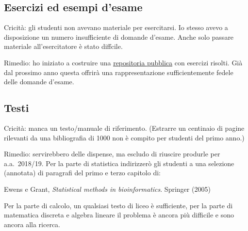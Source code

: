 \documentclass[10pt]{article}
\begin{document}
\subsection{Esercizi ed esempi d'esame}

Cricità: gli studenti non avevano materiale per esercitarsi. Io stesso avevo a disposizione un numero insufficiente di domande d'esame. Anche solo passare materiale all'esercitatore è stato diffcile.

Rimedio: ho iniziato a costruire una \href{https://github.com/domenicozambella/teaching/tree/master/Statistica}{repositoria pubblica\/} con esercizi risolti. Già dal prossimo anno questa offrirà una rappresentazione sufficientemente fedele delle domande d'esame. 


\subsection{Testi}

Cricità: manca un testo/manuale di riferimento. (Estrarre un centinaio di pagine rilevanti da una bibliografia di 1000 non è compito per studenti del primo anno.)

Rimedio: servirebbero delle dispense, ma escludo di riuscire produrle per a.a.~2018/19. Per la parte di statistica indirizzer\`o gli studenti a una selezione (annotata) di paragrafi del primo e terzo capitolo di:

Ewens e Grant, \textit{Statistical methods in bioinformatics}. Springer (2005)

Per la parte di calcolo, un qualsiasi testo di liceo è sufficiente, per la parte di matematica discreta e algebra lineare il problema è ancora più difficile e sono ancora alla ricerca. 
\end{document}
